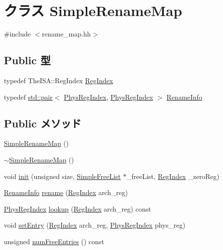 \hypertarget{classSimpleRenameMap}{
\section{クラス SimpleRenameMap}
\label{classSimpleRenameMap}
}


{\ttfamily \#include $<$rename\_\-map.hh$>$}\subsection*{Public 型}
\begin{DoxyCompactItemize}
\item 
typedef TheISA::RegIndex \hyperlink{classSimpleRenameMap_a36d25e03e43fa3bb4c5482cbefe5e0fb}{RegIndex}
\item 
typedef \hyperlink{classstd_1_1pair}{std::pair}$<$ \hyperlink{o3_2comm_8hh_a5ec29599c4bc29a3054c451674969e7b}{PhysRegIndex}, \hyperlink{o3_2comm_8hh_a5ec29599c4bc29a3054c451674969e7b}{PhysRegIndex} $>$ \hyperlink{classSimpleRenameMap_a3dc3673767d81356dfb2000480aed47b}{RenameInfo}
\end{DoxyCompactItemize}
\subsection*{Public メソッド}
\begin{DoxyCompactItemize}
\item 
\hyperlink{classSimpleRenameMap_a1dc644bcb497c501890dbc78d1acf28d}{SimpleRenameMap} ()
\item 
\hyperlink{classSimpleRenameMap_af5717bfeec7da90752952ab38dcab5c5}{$\sim$SimpleRenameMap} ()
\item 
void \hyperlink{classSimpleRenameMap_a3f27b4e0339fcd39d0f73659b8c72202}{init} (unsigned size, \hyperlink{classSimpleFreeList}{SimpleFreeList} $\ast$\_\-freeList, \hyperlink{classSimpleRenameMap_a36d25e03e43fa3bb4c5482cbefe5e0fb}{RegIndex} \_\-zeroReg)
\item 
\hyperlink{classstd_1_1pair}{RenameInfo} \hyperlink{classSimpleRenameMap_a18370a31dd17baa3a67d1ce3e0f43885}{rename} (\hyperlink{classSimpleRenameMap_a36d25e03e43fa3bb4c5482cbefe5e0fb}{RegIndex} arch\_\-reg)
\item 
\hyperlink{o3_2comm_8hh_a5ec29599c4bc29a3054c451674969e7b}{PhysRegIndex} \hyperlink{classSimpleRenameMap_a149269d2ce2fbf7e13ec91a5647bf170}{lookup} (\hyperlink{classSimpleRenameMap_a36d25e03e43fa3bb4c5482cbefe5e0fb}{RegIndex} arch\_\-reg) const 
\item 
void \hyperlink{classSimpleRenameMap_a5c6cad04be83122ff38650d859fbf1d8}{setEntry} (\hyperlink{classSimpleRenameMap_a36d25e03e43fa3bb4c5482cbefe5e0fb}{RegIndex} arch\_\-reg, \hyperlink{o3_2comm_8hh_a5ec29599c4bc29a3054c451674969e7b}{PhysRegIndex} phys\_\-reg)
\item 
unsigned \hyperlink{classSimpleRenameMap_a1fb7464c57712609e9d9ca38aff7fc8e}{numFreeEntries} () const 
\end{DoxyCompactItemize}
